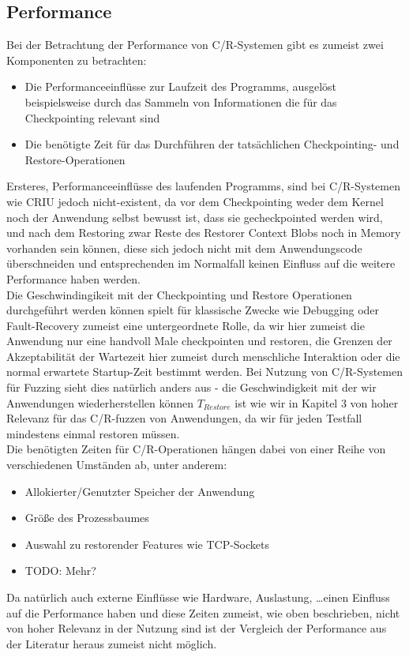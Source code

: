 \documentclass[a4paper]{article}
\begin{document}
\subsection{Performance}
Bei der Betrachtung der Performance von C/R-Systemen gibt es zumeist zwei Komponenten zu betrachten: 
\begin{itemize}
    \item Die Performanceeinflüsse zur Laufzeit des Programms, ausgelöst beispielsweise durch das Sammeln von Informationen die für das Checkpointing relevant sind
    \item Die benötigte Zeit für das Durchführen der tatsächlichen Checkpointing- und Restore-Operationen
\end{itemize}
Ersteres, Performanceeinflüsse des laufenden Programms, sind bei C/R-Systemen wie CRIU jedoch nicht-existent, da vor dem Checkpointing weder dem Kernel noch der Anwendung selbst bewusst ist, dass sie gecheckpointed werden wird, und nach dem Restoring zwar Reste des Restorer Context Blobs noch in Memory vorhanden sein können, diese sich jedoch nicht mit dem Anwendungscode überschneiden und entsprechenden im Normalfall keinen Einfluss auf die weitere Performance haben werden.\\
Die Geschwindingikeit mit der Checkpointing und Restore Operationen durchgeführt werden können spielt für klassische Zwecke wie Debugging oder Fault-Recovery zumeist eine untergeordnete Rolle, da wir hier zumeist die Anwendung nur eine handvoll Male checkpointen und restoren, die Grenzen der Akzeptabilität der Wartezeit hier zumeist durch menschliche Interaktion oder die normal erwartete Startup-Zeit bestimmt werden.
Bei Nutzung von C/R-Systemen für Fuzzing sieht dies natürlich anders aus - die Geschwindigkeit mit der wir Anwendungen wiederherstellen können $T_{Restore}$ ist wie wir in Kapitel 3 von hoher Relevanz für das C/R-fuzzen von Anwendungen, da wir für jeden Testfall mindestens einmal restoren müssen.\\
Die benötigten Zeiten für C/R-Operationen hängen dabei von einer Reihe von verschiedenen Umständen ab, unter anderem:
\begin{itemize}
    \item Allokierter/Genutzter Speicher der Anwendung
    \item Größe des Prozessbaumes
    \item Auswahl zu restorender Features wie TCP-Sockets
    \item TODO: Mehr?
\end{itemize}
Da natürlich auch externe Einflüsse wie Hardware, Auslastung, \dots einen Einfluss auf die Performance haben und diese Zeiten zumeist, wie oben beschrieben, nicht von hoher Relevanz in der Nutzung sind ist der Vergleich der Performance aus der Literatur heraus zumeist nicht möglich.\\
\end{document}
